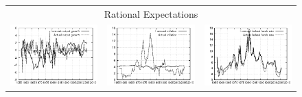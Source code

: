 \documentclass{beamer}
\begin{document}
{\begin{figure}[ht]
\begin{center}
\begin{tabular}{ccc}
\multicolumn{3}{c}{Rational Expectations} \\
\includegraphics[scale=0.2]{plots/nok_h_fe_y.png} & \includegraphics[scale=0.2]{plots/nok_h_fe_pi.png} & \includegraphics[scale=0.2]{plots/nok_h_fe_r.png} \\
\end{tabular}
\end{center}
\end{figure}
}
\end{document}
